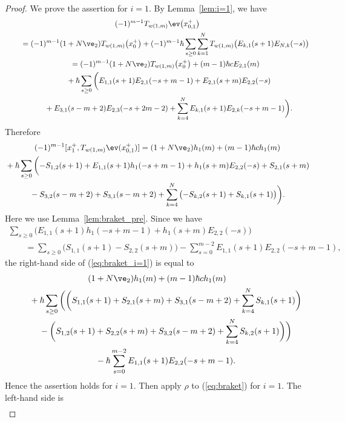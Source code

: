 \begin{proof}We prove the assertion for $i=1$. By Lemma~\ref{lem:i=1}, we have
\begin{gather*}
(-1)^{m-1}T_{w(1,m)}\ev\big(x_{0,1}^+\big) \\
 \qquad{} = (-1)^{m-1}(1+N\ve_2)T_{w(1,m)}\big(x_0^+\big) + (-1)^{m-1}\hbar \sum_{s \geq 0} \sum_{k=1}^N T_{w(1,m)}\big(E_{k,1}(s+1)E_{N,k}(-s)\big) \\
\qquad{} =(-1)^{m-1}(1+N\ve_2)T_{w(1,m)}\big(x_0^+\big) + (m-1)\hbar c E_{2,1}(m)\\
\qquad \quad{} + \hbar \sum_{s \geq 0} \bigg( E_{1,1}(s+1)E_{2,1}(-s+m-1) + E_{2,1}(s+m)E_{2,2}(-s) \\
 \qquad \quad{}+ E_{3,1}(s-m+2)E_{2,3}(-s+2m-2) + \sum_{k=4}^N E_{k,1}(s+1)E_{2,k}(-s+m-1) \bigg).
\end{gather*}
Therefore
\begin{gather}
(-1)^{m-1} [x_1^+, T_{w(1,m)} \ev(x_{0,1}^+)] = (1+N\ve_2)h_1(m) + (m-1)\hbar c h_1(m) \nonumber\\
{}+ \hbar \sum_{s \geq 0} \bigg( {-}S_{1,2}(s+1) + E_{1,1}(s+1)h_1(-s+m-1) + h_1(s+m)E_{2,2}(-s) + S_{2,1}(s+m)\nonumber\\
{}-S_{3,2}(s-m+2) + S_{3,1}(s-m+2) + \sum_{k=4}^N \big( {-}S_{k,2}(s+1) + S_{k,1}(s+1) \big) \bigg). \label{eq:braket_i=1}
\end{gather}
Here we use Lemma~\ref{lem:braket_pre}. Since we have
\begin{gather*}
\sum_{s \geq 0} \big( E_{1,1}(s+1)h_1(-s+m-1) + h_1(s+m)E_{2,2}(-s) \big)\\
\qquad {}=\sum_{s \geq 0} \big( S_{1,1}(s+1)-S_{2,2}(s+m) \big) - \sum_{s=0}^{m-2} E_{1,1}(s+1)E_{2,2}(-s+m-1),
\end{gather*}
the right-hand side of (\ref{eq:braket_i=1}) is equal to
\begin{gather*}
(1+N\ve_2)h_1(m) + (m-1)\hbar c h_1(m) \\
\qquad{} + \hbar \sum_{s \geq 0} \bigg( \bigg( S_{1,1}(s+1) + S_{2,1}(s+m) + S_{3,1}(s-m+2) + \sum_{k=4}^N S_{k,1}(s+1) \bigg) \\
\qquad{} - \bigg( S_{1,2}(s+1) + S_{2,2}(s+m) + S_{3,2}(s-m+2) + \sum_{k=4}^N S_{k,2}(s+1) \bigg) \bigg)\\
\qquad{} - \hbar \sum_{s=0}^{m-2} E_{1,1}(s+1)E_{2,2}(-s+m-1).
\end{gather*}
Hence the assertion holds for $i=1$. Then apply $\rho$ to (\ref{eq:braket}) for $i=1$. The left-hand side is
\begin{gather*}

\end{gather*}
\end{proof}
